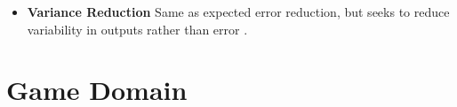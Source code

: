 \documentclass{sig-alternate}
\begin{document}
\begin{itemize}
\item \textbf{Variance Reduction} Same as expected error reduction, but seeks to reduce variability in outputs rather than error \cite{settles2012:al-book}.
\end{itemize}



\section{Game Domain}
\end{document}
